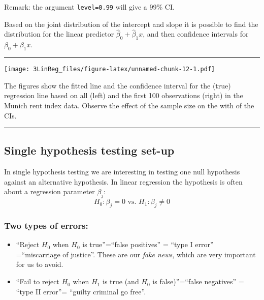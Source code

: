 \documentclass[]{article}
\begin{document}
Remark: the argument \texttt{level=0.99} will give a 99\% CI.

Based on the joint distribution of the intercept and slope it is
possible to find the distribution for the linear predictor
\(\hat{\beta}_0+\hat{\beta}_1 x\), and then confidence intervals for
\(\beta_0+\beta_1 x\).

\begin{center}\rule{0.5\linewidth}{\linethickness}\end{center}

\texttt{[image: 3LinReg\_files/figure-latex/unnamed-chunk-12-1.pdf]}

The figures show the fitted line and the confidence interval for the
(true) regression line based on all (left) and the first 100
observations (right) in the Munich rent index data. Observe the effect
of the sample size on the with of the CIs.

\begin{center}\rule{0.5\linewidth}{\linethickness}\end{center}

\hypertarget{single-hypothesis-testing-set-up}{%
\subsection{Single hypothesis testing
set-up}\label{single-hypothesis-testing-set-up}}

In single hypothesis testing we are interesting in testing one null
hypothesis against an alternative hypothesis. In linear regression the
hypothesis is often about a regression parameter \(\beta_j\):
\[H_0: \beta_j=0 \text{ vs. } H_1: \beta_j\neq 0\]

\hypertarget{two-types-of-errors}{%
\subsubsection{Two types of errors:}\label{two-types-of-errors}}

\begin{itemize}
\item
  ``Reject \(H_0\) when \(H_0\) is true''=``false positives'' = ``type I
  error'' =``miscarriage of justice''. These are our \emph{fake news},
  which are very important for us to avoid.
\item
  ``Fail to reject \(H_0\) when \(H_1\) is true (and \(H_0\) is
  false)''=``false negatives'' = ``type II error''= ``guilty criminal go
  free''.
\end{itemize}
\end{document}
